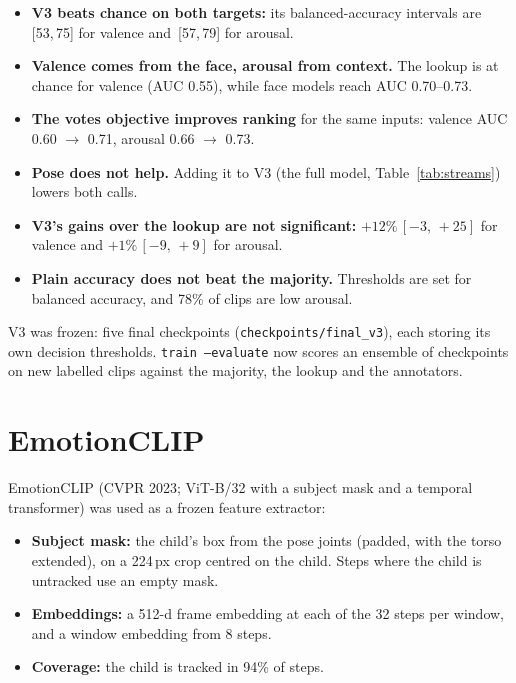 \documentclass[11pt]{article}
\newcommand{\code}[1]{\texttt{#1}}
\newcommand{\ci}[2]{\,[#1,\,#2]}
\begin{document}
\begin{itemize}
  \item \textbf{V3 beats chance on both targets:} its balanced-accuracy intervals are \ci{53}{75} for valence and \ci{57}{79} for arousal.
  \item \textbf{Valence comes from the face, arousal from context.} The lookup is at chance for valence (AUC 0.55), while face models reach AUC 0.70--0.73.
  \item \textbf{The votes objective improves ranking} for the same inputs: valence AUC 0.60 $\to$ 0.71, arousal 0.66 $\to$ 0.73.
  \item \textbf{Pose does not help.} Adding it to V3 (the full model, Table~\ref{tab:streams}) lowers both calls.
  \item \textbf{V3's gains over the lookup are not significant:} $+12\%\ci{-3}{+25}$ for valence and $+1\%\ci{-9}{+9}$ for arousal.
  \item \textbf{Plain accuracy does not beat the majority.} Thresholds are set for balanced accuracy, and 78\% of clips are low arousal.
\end{itemize}

V3 was frozen: five final checkpoints (\code{checkpoints/final\_v3}), each storing its own decision thresholds. \code{train --evaluate} now scores an ensemble of checkpoints on new labelled clips against the majority, the lookup and the annotators.

\section{EmotionCLIP}\label{sec:eclip}

EmotionCLIP (CVPR 2023; ViT-B/32 with a subject mask and a temporal transformer) was used as a frozen feature extractor:
\begin{itemize}
  \item \textbf{Subject mask:} the child's box from the pose joints (padded, with the torso extended), on a 224\,px crop centred on the child. Steps where the child is untracked use an empty mask.
  \item \textbf{Embeddings:} a 512-d frame embedding at each of the 32 steps per window, and a window embedding from 8 steps.
  \item \textbf{Coverage:} the child is tracked in 94\% of steps.
\end{itemize}
\end{document}
